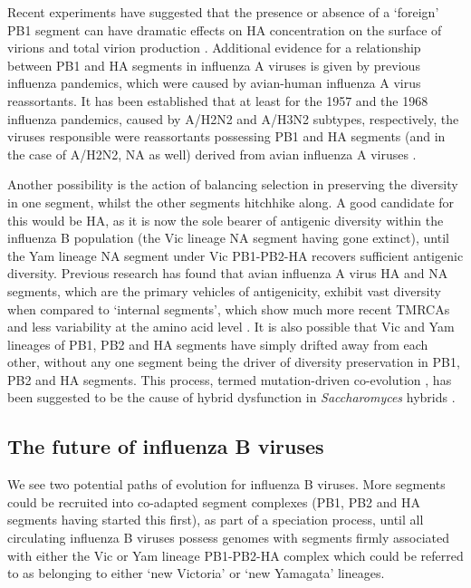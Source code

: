 \documentclass[11pt,oneside,letterpaper]{article}
\begin{document}
Recent experiments have suggested that the presence or absence of a `foreign' PB1 segment can have dramatic effects on HA concentration on the surface of virions and total virion production \cite{cobbin2013}.
Additional evidence for a relationship between PB1 and HA segments in influenza A viruses is given by previous influenza pandemics, which were caused by avian-human influenza A virus reassortants.
It has been established that at least for the 1957 and the 1968 influenza pandemics, caused by A/H2N2 and A/H3N2 subtypes, respectively, the viruses responsible were reassortants possessing PB1 and HA segments (and in the case of A/H2N2, NA as well) derived from avian influenza A viruses \cite{kawaoka1989}.

Another possibility is the action of balancing selection in preserving the diversity in one segment, whilst the other segments hitchhike along.
A good candidate for this would be HA, as it is now the sole bearer of antigenic diversity within the influenza B population (the Vic lineage NA segment having gone extinct), until the Yam lineage NA segment under Vic PB1-PB2-HA recovers sufficient antigenic diversity.
Previous research has found that avian influenza A virus HA and NA segments, which are the primary vehicles of antigenicity, exhibit vast diversity when compared to `internal segments', which show much more recent TMRCAs and less variability at the amino acid level \cite{chen2006,obenauer2006}.
It is also possible that Vic and Yam lineages of PB1, PB2 and HA segments have simply drifted away from each other, without any one segment being the driver of diversity preservation in PB1, PB2 and HA segments.
This process, termed mutation-driven co-evolution \cite{presgraves2010}, has been suggested to be the cause of hybrid dysfunction in \textit{Saccharomyces} hybrids \cite{lee2008}.

\subsection*{The future of influenza B viruses}
We see two potential paths of evolution for influenza B viruses.
More segments could be recruited into co-adapted segment complexes (PB1, PB2 and HA segments having started this first), as part of a speciation process, until all circulating influenza B viruses possess genomes with segments firmly associated with either the Vic or Yam lineage PB1-PB2-HA complex which could be referred to as belonging to either `new Victoria' or `new Yamagata' lineages.
\end{document}
